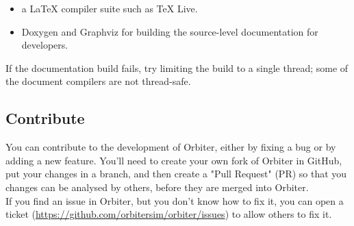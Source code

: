 \documentclass[Orbiter Developer Manual.tex]{subfiles}
\begin{document}
\begin{itemize}
\item a LaTeX compiler suite such as TeX Live.
\item Doxygen and Graphviz for building the source-level documentation for developers.
\end{itemize}

\noindent
If the documentation build fails, try limiting the build to a single thread; some of the document compilers are not thread-safe.


\subsection{Contribute}
You can contribute to the development of Orbiter, either by fixing a bug or by adding a new feature. You'll need to create your own fork of Orbiter in GitHub, put your changes in a branch, and then create a "Pull Request" (PR) so that you changes can be analysed by others, before they are merged into Orbiter.\\
If you find an issue in Orbiter, but you don't know how to fix it, you can open a ticket (\url{https://github.com/orbitersim/orbiter/issues}) to allow others to fix it.
\end{document}
